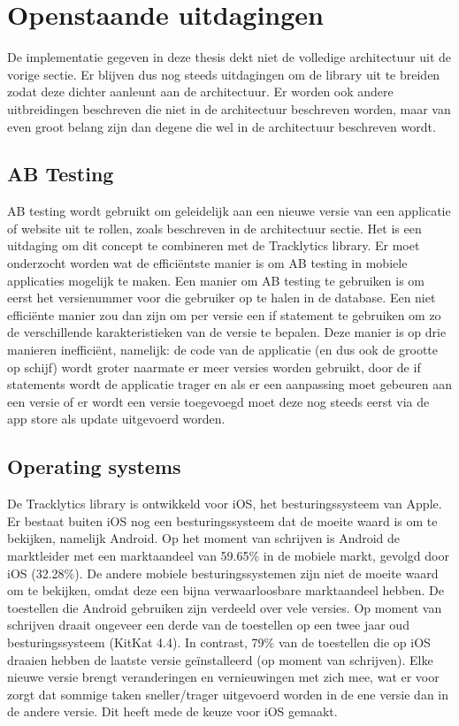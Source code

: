 \section{Openstaande uitdagingen}
De implementatie gegeven in deze thesis dekt niet de volledige architectuur uit de vorige sectie. Er blijven dus nog steeds uitdagingen om de library uit te breiden zodat deze dichter aanleunt aan de architectuur. Er worden ook andere uitbreidingen beschreven die niet in de architectuur beschreven worden, maar van even groot belang zijn dan degene die wel in de architectuur beschreven wordt. 

\subsection{AB Testing}
AB testing wordt gebruikt om geleidelijk aan een nieuwe versie van een applicatie of website uit te rollen, zoals beschreven in de architectuur sectie. Het is een uitdaging om dit concept te combineren met de Tracklytics library. Er moet onderzocht worden wat de effici\"entste manier is om AB testing in mobiele applicaties mogelijk te maken.  Een manier om AB testing te gebruiken is om eerst het versienummer voor die gebruiker op te halen in de database. Een niet effici\"ente manier zou dan zijn om per versie een if statement te gebruiken om zo de verschillende karakteristieken van de versie te bepalen. Deze manier is op drie manieren ineffici\"ent, namelijk: de code van de applicatie (en dus ook de grootte op schijf) wordt groter naarmate er meer versies worden gebruikt, door de if statements wordt de applicatie trager en als er een aanpassing moet gebeuren aan een versie of er wordt een versie toegevoegd moet deze nog steeds eerst via de app store als update uitgevoerd worden.


\subsection{Operating systems} %
De Tracklytics library is ontwikkeld voor iOS, het besturingssysteem van Apple. Er bestaat buiten iOS nog een besturingssysteem dat de moeite waard is om te bekijken, namelijk Android. Op het moment van schrijven is Android de marktleider met een marktaandeel van 59.65\% in de mobiele markt, gevolgd door iOS (32.28\%). De andere mobiele besturingssystemen zijn niet de moeite waard om te bekijken, omdat deze een bijna verwaarloosbare marktaandeel hebben. De toestellen die Android gebruiken zijn verdeeld over vele versies. Op moment van schrijven draait ongeveer een derde van de toestellen op een twee jaar oud besturingssysteem (KitKat 4.4). In contrast, 79\% van de toestellen die op iOS draaien hebben de laatste versie ge\"installeerd (op moment van schrijven). Elke nieuwe versie brengt veranderingen en vernieuwingen met zich mee, wat er voor zorgt dat sommige taken sneller/trager uitgevoerd worden in de ene versie dan in de andere versie. Dit heeft mede de keuze voor iOS gemaakt. \\

